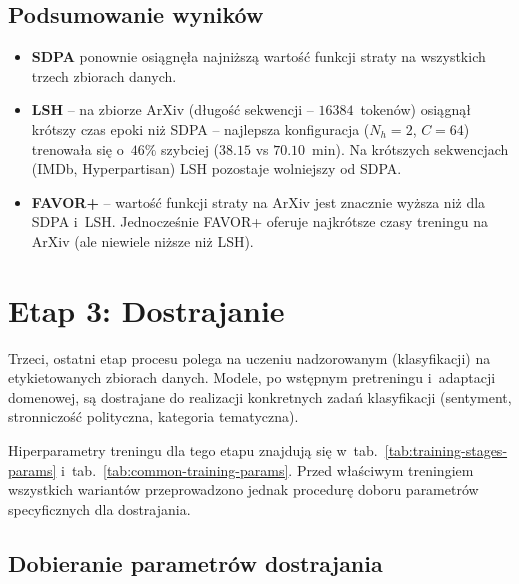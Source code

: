 \documentclass[a4paper,11pt,twoside]{report}
\theoremstyle{definition}
\begin{document}
\subsection{Podsumowanie wyników}

\begin{itemize}
    \item \textbf{SDPA} ponownie osiągnęła najniższą wartość funkcji straty na wszystkich trzech zbiorach danych.
    
    \item \textbf{LSH} -- na zbiorze ArXiv (długość sekwencji -- $16384$~tokenów) osiągnął krótszy czas epoki niż SDPA -- najlepsza konfiguracja ($N_h{=}2$, $C{=}64$) trenowała się o~$46\%$ szybciej ($38.15$ vs $70.10$~min). Na krótszych sekwencjach (IMDb, Hyperpartisan) LSH pozostaje wolniejszy od SDPA.
    
    \item \textbf{FAVOR+} -- wartość funkcji straty na ArXiv jest znacznie wyższa niż dla SDPA i~LSH. Jednocześnie FAVOR+ oferuje najkrótsze czasy treningu na ArXiv (ale niewiele niższe niż LSH).
    
\end{itemize}



















\section{Etap 3: Dostrajanie}\label{sec:stage3}

Trzeci, ostatni etap procesu polega na uczeniu nadzorowanym (klasyfikacji) na etykietowanych zbiorach danych. Modele, po wstępnym pretreningu i~adaptacji domenowej, są dostrajane do realizacji konkretnych zadań klasyfikacji (sentyment, stronniczość polityczna, kategoria tematyczna).

Hiperparametry treningu dla tego etapu znajdują się w~tab.~\ref{tab:training-stages-params} i~tab.~\ref{tab:common-training-params}. Przed właściwym treningiem wszystkich wariantów przeprowadzono jednak procedurę doboru parametrów specyficznych dla dostrajania.

\subsection{Dobieranie parametrów dostrajania}
\end{document}
